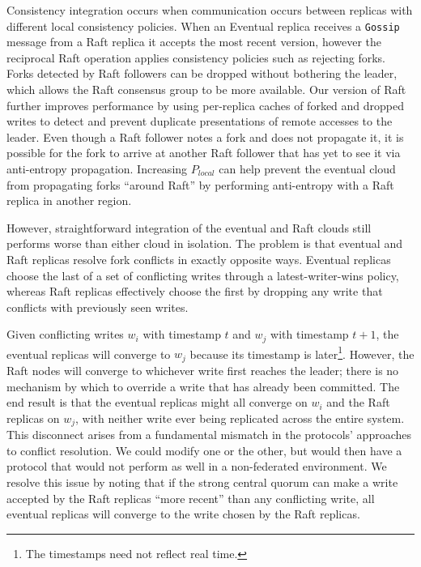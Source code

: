 \documentclass[10pt,conference,letterpaper]{IEEEtran}
\begin{document}
Consistency integration occurs when communication occurs between replicas with
different local consistency policies.
When an Eventual replica receives a \texttt{Gossip} message from a Raft
replica it accepts the most recent version, however the reciprocal Raft
operation applies consistency policies such as rejecting forks.
Forks detected by Raft followers can be dropped without bothering the leader,
which allows the Raft consensus group to be more available.
Our version of Raft further improves performance by using per-replica caches
of forked and dropped writes to detect and prevent duplicate presentations of
remote accesses to the leader.
Even though a Raft follower notes a fork and does not propagate it, it is
possible for the fork to arrive at another Raft follower that has yet to see
it via anti-entropy propagation.
Increasing $P_{local}$ can help prevent the eventual cloud from
propagating forks ``around Raft'' by performing anti-entropy with a Raft replica
in another region.

However, straightforward integration of the eventual and Raft clouds still
performs worse than either cloud in isolation.
The problem is that eventual and Raft replicas resolve fork conflicts in
exactly opposite ways.
Eventual replicas choose the last of a set of conflicting writes through a
latest-writer-wins policy, whereas Raft replicas effectively choose the first
by dropping any write that conflicts with previously seen writes.

Given conflicting writes $w_i$ with timestamp $t$ and $w_j$ with timestamp
$t+1$, the eventual replicas will converge to $w_j$ because its timestamp is
later\footnote{The timestamps need not reflect real time.}.
However, the Raft nodes will converge to whichever write first reaches the
leader; there is no mechanism by which to override a write that has already
been committed.
The end result is that the eventual replicas might all converge on $w_i$ and
the Raft replicas on $w_j$, with neither write ever being replicated across
the entire system.
This disconnect arises from a fundamental mismatch in the protocols'
approaches to conflict resolution.
We could modify one or the other, but would then have a protocol that would
not perform as well in a non-federated environment.
We resolve this issue by noting that if the strong central quorum can make a
write accepted by the Raft replicas ``more recent'' than any conflicting
write, all eventual replicas will converge to the write chosen by the Raft
replicas.
\end{document}
